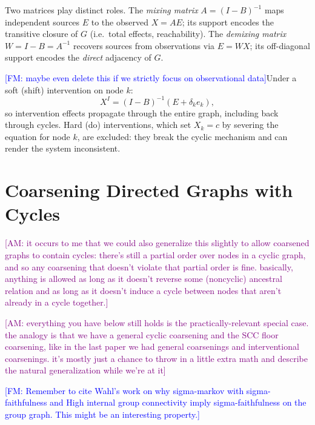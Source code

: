 \documentclass{article}
\newcommand{\alexsays}[1]{\textcolor{purple}{[AM: #1]}}
\newcommand{\fransays}[1]{\textcolor{blue}{[FM: #1]}}
\begin{document}
Two matrices play distinct roles. The \emph{mixing matrix} $A = (I - B)^{-1}$ maps independent sources $E$ to the observed $X = AE$; its support encodes the transitive closure of $G$ (i.e.\ total effects, reachability). The \emph{demixing matrix} $W = I - B = A^{-1}$ recovers sources from observations via $E = WX$; its off-diagonal support encodes the \emph{direct} adjacency of $G$.

\fransays{maybe even delete this if we strictly focus on observational data}Under a soft (shift) intervention on node $k$:
\begin{equation}\label{eq:soft}
    X^{I} = (I - B)^{-1}(E + \delta_k e_k),
\end{equation}
so intervention effects propagate through the entire graph, including back through cycles. Hard (do) interventions, which set $X_k = c$ by severing the equation for node $k$, are excluded: they break the cyclic mechanism and can render the system inconsistent.


\section{Coarsening Directed Graphs with Cycles}
\label{sec:cycles}

\alexsays{it occurs to me that we could also generalize this slightly to allow coarsened graphs to contain cycles: there's still a partial order over nodes in a cyclic graph, and so any coarsening that doesn't violate that partial order is fine. basically, anything is allowed as long as it doesn't reverse some (noncyclic) ancestral relation and as long as it doesn't induce a cycle between nodes that aren't already in a cycle together.}

\alexsays{everything you have below still holds is the practically-relevant special case. the analogy is that we have a general cyclic coarsening and the SCC floor coarsening, like in the last paper we had general coarsenings and interventional coarsenings. it's mostly just a chance to throw in a little extra math and describe the natural generalization while we're at it}

\fransays{Remember to cite Wahl's work on why sigma-markov with sigma-faithfulness and High internal group connectivity imply sigma-faithfulness on the group graph. This might be an interesting property.}
\end{document}
